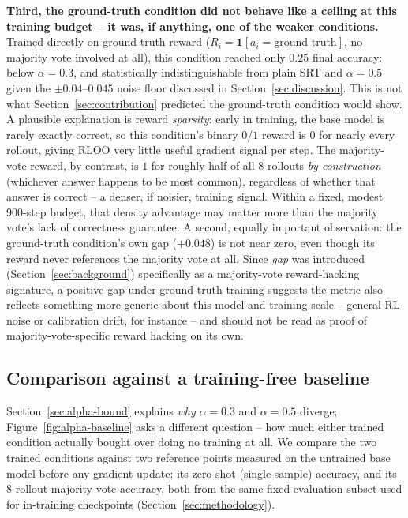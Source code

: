 \documentclass{article}
\begin{document}
\textbf{Third, the ground-truth condition did not behave like a ceiling at this
training budget -- it was, if anything, one of the weaker conditions.}
Trained directly on ground-truth reward ($R_i = \mathbf{1}[a_i =
\text{ground truth}]$, no majority vote involved at all), this condition
reached only $0.25$ final accuracy: below $\alpha{=}0.3$, and statistically
indistinguishable from plain SRT and $\alpha{=}0.5$ given the
$\pm0.04$--$0.045$ noise floor discussed in Section~\ref{sec:discussion}.
This is not what Section~\ref{sec:contribution} predicted the ground-truth
condition would show. A plausible explanation is reward \emph{sparsity}: early in training,
the base model is rarely exactly correct, so this condition's binary
$0$/$1$ reward is $0$ for nearly every rollout, giving RLOO very little
useful gradient signal per step. The majority-vote reward, by contrast, is
$1$ for roughly half of all $8$ rollouts \emph{by construction} (whichever
answer happens to be most common), regardless of whether that answer is
correct -- a denser, if noisier, training signal. Within a fixed, modest
900-step budget, that density advantage may matter more than the majority
vote's lack of correctness guarantee. A second, equally important
observation: the ground-truth condition's own gap ($+0.048$) is not near zero, even though
its reward never references the majority vote at all. Since \emph{gap} was
introduced (Section~\ref{sec:background}) specifically as a majority-vote
reward-hacking signature, a positive gap under ground-truth training
suggests the metric also reflects something more generic about this model
and training scale -- general RL noise or calibration drift, for instance
-- and should not be read as proof of majority-vote-specific reward hacking
on its own.

\subsection{Comparison against a training-free baseline}

Section~\ref{sec:alpha-bound} explains \emph{why} $\alpha{=}0.3$ and
$\alpha{=}0.5$ diverge; Figure~\ref{fig:alpha-baseline} asks a different
question -- how much either trained condition actually bought over doing no
training at all. We compare the two trained conditions against two
reference points measured on the untrained base model before any gradient
update: its zero-shot (single-sample) accuracy, and its 8-rollout
majority-vote accuracy, both from the same fixed evaluation subset used for
in-training checkpoints (Section~\ref{sec:methodology}).
\end{document}
